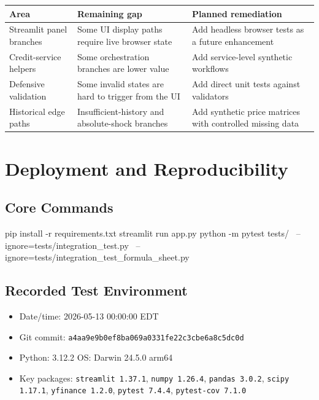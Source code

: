 \documentclass[11pt]{article}
\newcommand{\code}[1]{\texttt{#1}}
\begin{document}
\begin{center}
\begin{tabular}{L{3.5cm}L{5.5cm}L{4.5cm}}
\toprule
\textbf{Area} & \textbf{Remaining gap} & \textbf{Planned remediation} \\
\midrule
Streamlit panel branches  & Some UI display paths require live browser state & Add headless browser tests as a future enhancement \\
Credit-service helpers    & Some orchestration branches are lower value & Add service-level synthetic workflows \\
Defensive validation      & Some invalid states are hard to trigger from the UI & Add direct unit tests against validators \\
Historical edge paths     & Insufficient-history and absolute-shock branches & Add synthetic price matrices with controlled missing data \\
\bottomrule
\end{tabular}
\end{center}

\section{Deployment and Reproducibility}

\subsection{Core Commands}

\begin{shellcode}
pip install -r requirements.txt
streamlit run app.py
python -m pytest tests/ \
  --ignore=tests/integration_test.py \
  --ignore=tests/integration_test_formula_sheet.py
\end{shellcode}

\subsection{Recorded Test Environment}

\begin{itemize}
  \item Date/time: 2026-05-13 00:00:00 EDT
  \item Git commit: \code{a4aa9e9b0ef8ba069a0331fe22c3cbe6a8c5dc0d}
  \item Python: 3.12.2 \quad OS: Darwin 24.5.0 arm64
  \item Key packages: \code{streamlit 1.37.1}, \code{numpy 1.26.4},
    \code{pandas 3.0.2}, \code{scipy 1.17.1}, \code{yfinance 1.2.0},
    \code{pytest 7.4.4}, \code{pytest-cov 7.1.0}
\end{itemize}
\end{document}
